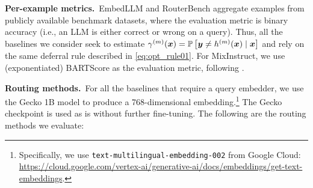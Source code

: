 \textbf{Per-example metrics.}\
EmbedLLM and  RouterBench aggregate examples from publicly available benchmark datasets, where the evaluation metric is binary accuracy (i.e., an LLM is either correct or wrong on a query). Thus, all the baselines we consider seek to estimate $\gamma^{(m)}(\boldsymbol{x}) = \mathbb{P}\left[\boldsymbol{y}\ne h^{(m)}(\boldsymbol{x})\mid\boldsymbol{x}\right]$ and rely on the same deferral rule described in \eqref{eq:opt_rule01}.
For MixInstruct, we use (exponentiated) BARTScore \citep{YuaNeuLiu2021} as the evaluation metric, following \citet{Jiang:2023}. 




\textbf{Routing methods.}\
For all the baselines that require a query embedder, we use the Gecko 1B  model  \citep{LeeDaiRen2024} to produce a 768-dimensional embedding.\footnote{Specifically, we use \texttt{text-multilingual-embedding-002} from Google Cloud: \url{https://cloud.google.com/vertex-ai/generative-ai/docs/embeddings/get-text-embeddings}.}
The Gecko checkpoint is used as is without further fine-tuning. The following are the routing methods we evaluate: 
